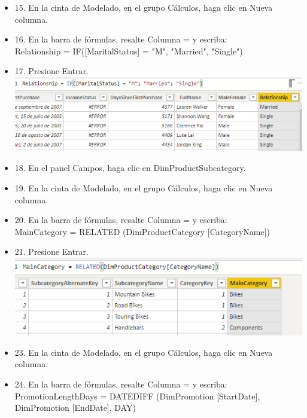\begin{itemize}
\item 15. En la cinta de Modelado, en el grupo Cálculos, haga clic en Nueva columna.

\item 16. En la barra de fórmulas, resalte Columna = y escriba:\\
Relationship = IF([MaritalStatus] = "M", "Married", "Single")\\
\item 17. Presione Entrar. \\
\includegraphics[scale=0.5]{./Imagenes/image024}
\item 18. En el panel Campos, haga clic en DimProductSubcategory.

\item 19. En la cinta de Modelado, en el grupo Cálculos, haga clic en Nueva columna.

\item 20. En la barra de fórmulas, resalte Columna = y escriba:\\
MainCategory = RELATED (DimProductCategory [CategoryName])
\\
\item 21. Presione Entrar.\\
\includegraphics[scale=0.5]{./Imagenes/image025}
\item 23. En la cinta de Modelado, en el grupo Cálculos, haga clic en Nueva columna.
\item 24. En la barra de fórmulas, resalte Columna = y escriba:\\
PromotionLengthDays = DATEDIFF (DimPromotion [StartDate], DimPromotion [EndDate], DAY)\\


\end{itemize}
